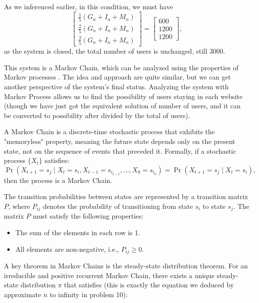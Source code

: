 \documentclass[12pt,a4paper]{article}
\begin{document}
\begin{solution}
As we inferenced earlier, in this condition, we must have 
\[
\begin{bmatrix}
    \frac{1}{5}(G_n+I_n+M_n)\\\frac{2}{5}(G_n+I_n+M_n)\\\frac{2}{5}(G_n+I_n+M_n)
\end{bmatrix}
=
\begin{bmatrix}
   600\\1200\\1200
\end{bmatrix},
\]
as the system is closed, the total number of users is unchanged, still 3000.
\end{solution}

\begin{remark}
    This system is a Markov Chain, which can be analyzed using the properties of Markov processes \parencite{ross_first_2019}. The idea and approach are quite similar, but we can get another perspective of the system's final status. Analyzing the system with Markov Process allows us to find the possibility of users staying in each website (though we have just got the equivalent solution of number of users, and it can be converted to possibility after divided by the total of users).
\begin{definition}
 A Markov Chain is a discrete-time stochastic process that exhibits the "memoryless" property, meaning the future state depends only on the present state, not on the sequence of events that preceded it. Formally, if a stochastic process \(\{X_t\}\) satisfies:
    \[
    \Pr(X_{t+1} = s_j \mid X_t = s_i, X_{t-1} = s_{i_{t-1}}, \dots, X_0 = s_{i_0}) = \Pr(X_{t+1} = s_j \mid X_t = s_i),
    \]
    then the process is a Markov Chain.
\end{definition}

    The transition probabilities between states are represented by a transition matrix \( P \), where \( P_{ij} \) denotes the probability of transitioning from state \( s_i \) to state \( s_j \). The matrix \( P \) must satisfy the following properties:
    \begin{itemize}
        \item The sum of the elements in each row is 1.
        \item All elements are non-negative, i.e., \( P_{ij} \geq 0 \).
    \end{itemize}

    A key theorem in Markov Chains is the steady-state distribution theorem. For an irreducible and positive recurrent Markov Chain, there exists a unique steady-state distribution \(\pi\) that satisfies (this is exactly the equation we deduced by approximate $n$ to infinity in problem 10):


\end{remark}
\end{document}
